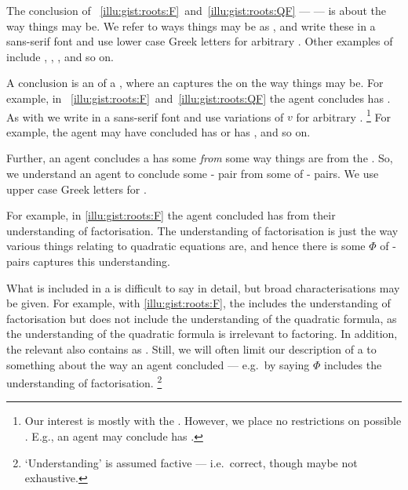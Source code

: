 \begin{note}
  The conclusion of ~\ref{illu:gist:roots:F}~and~\ref{illu:gist:roots:QF} --- \propM{\rootsCon{}} --- is about the way things may be.
  We refer to ways things may be as \emph{}, and write these in a \textsf{sans-serif} font and use lower case Greek letters for arbitrary .
  Other examples of  include , , , and so on.

  A conclusion is an \eval{} of a , where an \eval{} captures the \agpe{} on the way things may be.
  For example, in ~\ref{illu:gist:roots:F}~and~\ref{illu:gist:roots:QF} the agent concludes \propM{\rootsCon{}} has \emph{} .
  As with  we write  in a \textsf{sans-serif} font and use variations of \(v\) for arbitrary .%
  \footnote{
    Our interest is mostly with the \val{} .
    However, we place no restrictions on possible .
    E.g., an agent may conclude  has \val{} .
  }
  For example, the agent may have concluded \propM{\rootsCon{}} has \val{}  or \propM{\rootsConBad{}} has \val{} , and so on.
\end{note}


\begin{note}
  Further, an agent concludes a  has some  \emph{from} some way things are from the \agpe{}.
  So, we understand an agent to conclude some - pair from some \emph{\pool{}} of \prop{}-\val{} pairs.
  We use upper case Greek letters for .

  For example, in \autoref{illu:gist:roots:F} the agent concluded \propM{\rootsCon{}} has  from their understanding of factorisation.
  The \agents{} understanding of factorisation is just the way various things relating to quadratic equations are, and hence there is some \pool{} \(\Phi\) of - pairs captures this understanding.

  What is included in a \pool{} is difficult to say in detail, but broad characterisations may be given.
  For example, with \autoref{illu:gist:roots:F}, the \pool{} includes the \agents{} understanding of factorisation but does not include the \agents{} understanding of the quadratic formula, as the \agents{} understanding of the quadratic formula is irrelevant to factoring.
  In addition, the relevant \pool{} also contains \rootsConEq{} \evaled{} as .
  Still, we will often limit our description of a \pool{} to something about the way an agent concluded --- e.g.\ by saying \(\Phi\) includes the \agents{} understanding of factorisation.%
  \footnote{
    `Understanding' is assumed factive --- i.e.\ correct, though maybe not exhaustive.
  }
\end{note}


